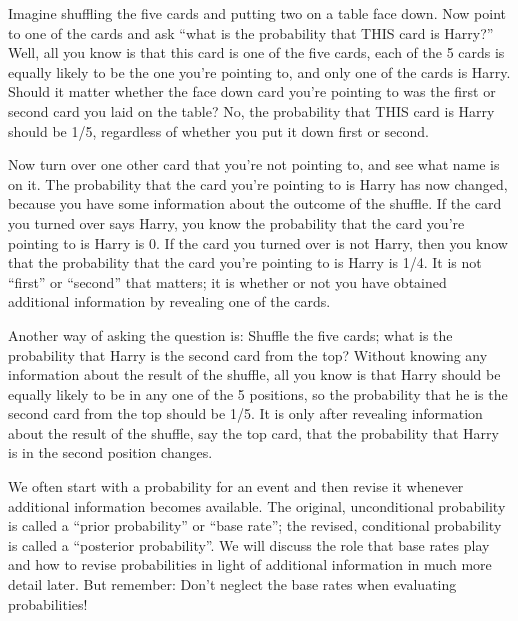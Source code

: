 \documentclass[
  letterpaper,
  DIV=11,
  numbers=noendperiod]{scrreprt}
\theoremstyle{plain}
\theoremstyle{definition}
\theoremstyle{definition}
\theoremstyle{definition}
\theoremstyle{remark}
\begin{document}
Imagine shuffling the five cards and putting two on a table face down.
Now point to one of the cards and ask ``what is the probability that
THIS card is Harry?'' Well, all you know is that this card is one of the
five cards, each of the 5 cards is equally likely to be the one you're
pointing to, and only one of the cards is Harry. Should it matter
whether the face down card you're pointing to was the first or second
card you laid on the table? No, the probability that THIS card is Harry
should be 1/5, regardless of whether you put it down first or second.

Now turn over one other card that you're not pointing to, and see what
name is on it. The probability that the card you're pointing to is Harry
has now changed, because you have some information about the outcome of
the shuffle. If the card you turned over says Harry, you know the
probability that the card you're pointing to is Harry is 0. If the card
you turned over is not Harry, then you know that the probability that
the card you're pointing to is Harry is 1/4. It is not ``first'' or
``second'' that matters; it is whether or not you have obtained
additional information by revealing one of the cards.

Another way of asking the question is: Shuffle the five cards; what is
the probability that Harry is the second card from the top? Without
knowing any information about the result of the shuffle, all you know is
that Harry should be equally likely to be in any one of the 5 positions,
so the probability that he is the second card from the top should be
1/5. It is only after revealing information about the result of the
shuffle, say the top card, that the probability that Harry is in the
second position changes.

We often start with a probability for an event and then revise it
whenever additional information becomes available. The original,
unconditional probability is called a ``prior probability'' or ``base
rate''; the revised, conditional probability is called a ``posterior
probability''. We will discuss the role that base rates play and how to
revise probabilities in light of additional information in much more
detail later. But remember: Don't neglect the base rates when evaluating
probabilities!
\end{document}
